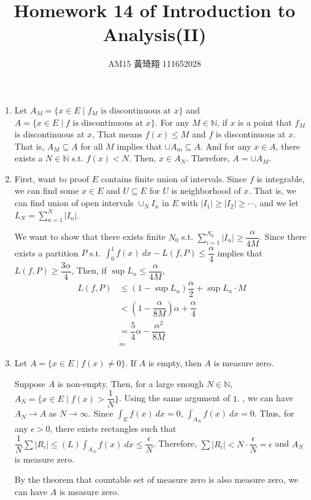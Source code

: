 \documentclass[12pt]{article}
\title{Homework 14 of Introduction to Analysis(II)}
\author{AM15 黃琦翔 111652028}
\begin{document}
\maketitle
\begin{enumerate}
    \item Let $A_M = \{x \in E \mid f_M\text{ is discontinuous at } x\}$ and $A = \{ x\in E \mid f\text{ is discontinuous at } x\}$.
    For any $M \in \mathbb{N}$, if $x$ is a point that $f_M$ is discontinuous at $x$, 
    That means $f(x) \leq M$ and $f$ is discontinuous at $x$.
    That is, $A_M \subseteq A$ for all $M$ implies that $\cup A_m \subseteq A$.
    And for any $x \in A$, there exists a $N \in \mathbb{N}$ s.t. $f(x) < N$.
    Then, $x \in A_N$.
    Therefore, $A = \cup A_M$.

    \item First, want to proof $E$ contains finite union of intervals.
    Since $f$ is integrable, we can find some $x \in E$ and $U\subseteq E$ for $U$ is neighborhood of $x$.
    That is, we can find union of open intervals $\cup_N I_n$ in $E$ with $|I_1| \geq |I_2|\geq \cdots$, and we let $L_N = \displaystyle\sum_{n=1}^N|I_n|$.
    
    We want to show that there exists finite $N_0$ s.t. $\displaystyle\sum_{i=1}^{N_0} |I_n| \geq \dfrac{\alpha}{4M}$.
    Since there exists a partition $P$ s.t. $\displaystyle\int_{0}^{1} f(x)\ dx - L(f, P) \leq \dfrac{\alpha}{4}$ implies that $L(f, P) \geq \dfrac{3\alpha}{4}$,
    Then, if $\sup L_n \leq \dfrac{\alpha}{4M}$, \begin{align*}
        L(f, P) &\leq (1-\sup L_n)\dfrac{\alpha}{2} + \sup L_n \cdot M \\
        &< (1-\dfrac{\alpha}{8M})\alpha + \dfrac{\alpha}{4}\\
        &= \dfrac{5}{4}\alpha - \dfrac{\alpha^2}{8M}\\
        &=
    \end{align*}
    
    \item Let $A = \{x \in E\mid f(x)\neq 0\}$. If $A$ is empty, then $A$ is measure zero.
    
    Suppose $A$ is non-empty.
    Then, for a large enough $N\in \mathbb{N}$, $A_N = \{x\in E\mid f(x) > \dfrac{1}{N}\}$.
    Using the same argument of $1$. , we can have $A_N \to A$ as $N \to \infty$.
    Since $\displaystyle\int_{E} f(x)\ dx = 0$, $\displaystyle\int_{A_N} f(x)\ dx = 0$.
    Thus, for any $\epsilon > 0$, there exists rectangles such that $\dfrac{1}{N}\sum |R_i| \leq (L)\displaystyle\int_{A_N} f(x)\ dx \leq \dfrac{\epsilon}{N}$.
    Therefore, $\sum |R_i| < N \cdot \dfrac{\epsilon}{N} = \epsilon$ and $A_N$ is measure zero.
    
    By the theorem that countable set of measure zero is also measure zero, we can have $A$ is measure zero.
\end{enumerate}
\end{document}
